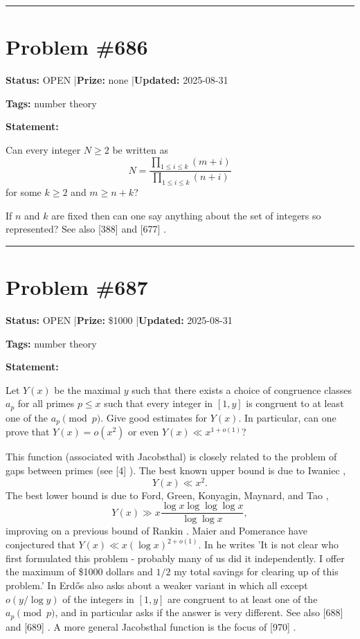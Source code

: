 \documentclass{article}
\begin{document}
\noindent\rule{\linewidth}{0.4pt}


\section{Problem \#686}
\label{prob:686}

\noindent\textbf{Status:} OPEN \quad|\quad \textbf{Prize:} none \quad|\quad \textbf{Updated:} 2025-08-31

\noindent\textbf{Tags:} number theory

\medskip

\noindent\textbf{Statement:}

Can every integer $N\geq 2$ be written as\[N=\frac{\prod_{1\leq i\leq k}(m+i)}{\prod_{1\leq i\leq k}(n+i)}\]for some $k\geq 2$ and $m\geq n+k$?




If $n$ and $k$ are fixed then can one say anything about the set of integers so represented? See also [388] and [677] .

\noindent\rule{\linewidth}{0.4pt}


\section{Problem \#687}
\label{prob:687}

\noindent\textbf{Status:} OPEN \quad|\quad \textbf{Prize:} \$1000 \quad|\quad \textbf{Updated:} 2025-08-31

\noindent\textbf{Tags:} number theory

\medskip

\noindent\textbf{Statement:}

Let $Y(x)$ be the maximal $y$ such that there exists a choice of congruence classes $a_p$ for all primes $p\leq x$ such that every integer in $[1,y]$ is congruent to at least one of the $a_p\pmod{p}$. Give good estimates for $Y(x)$. In particular, can one prove that $Y(x)=o(x^2)$ or even $Y(x)\ll x^{1+o(1)}$?




This function (associated with Jacobsthal) is closely related to the problem of gaps between primes (see [4] ). The best known upper bound is due to Iwaniec \cite{Iw78},\[Y(x) \ll x^2.\]The best lower bound is due to Ford, Green, Konyagin, Maynard, and Tao \cite{FGKMT18},\[Y(x) \gg x\frac{\log x\log\log\log x}{\log\log x},\]improving on a previous bound of Rankin \cite{Ra38}. Maier and Pomerance have conjectured that $Y(x)\ll x(\log x)^{2+o(1)}$. In \cite{Er80} he writes 'It is not clear who first formulated this problem - probably many of us did it independently. I offer the maximum of \$1000 dollars and $1/2$ my total savings for clearing up of this problem.' In \cite{Er80} Erd\H{o}s also asks about a weaker variant in which all except $o(y/\log y)$ of the integers in $[1,y]$ are congruent to at least one of the $a_p\pmod{p}$, and in particular asks if the answer is very different. See also [688] and [689] . A more general Jacobsthal function is the focus of [970] .
\end{document}
